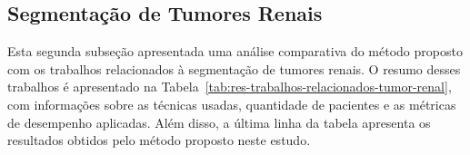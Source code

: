 \subsection{Segmentação de Tumores Renais}
\label{sec:disc-trab-relac-tumor-renal}

Esta segunda subseção apresentada uma análise comparativa do método proposto com os trabalhos relacionados à segmentação de tumores renais. O resumo desses trabalhos é apresentado na Tabela~\ref{tab:res-trabalhos-relacionados-tumor-renal}, com informações sobre as técnicas usadas, quantidade de pacientes e as métricas de desempenho aplicadas. Além disso, a última linha da tabela apresenta os resultados obtidos pelo método proposto neste estudo.

\begin{table}[!ht]
\caption{Comparação dos resultados do método com trabalhos relacionados à segmentação de tumores renais.}
\label{tab:res-trabalhos-relacionados-tumor-renal}
\centering
\doublespacing
{}
\end{table}
